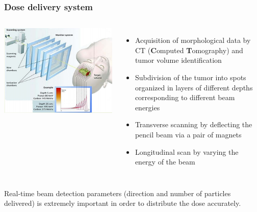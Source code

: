 \documentclass[aspectratio=169]{beamer}
\begin{document}
	\begin{frame}
		\frametitle{Dose delivery system}
		\begin{columns}
			\includegraphics[width=0.95 \textwidth]{IMG/Beam_Monitoring.PNG}
			\begin{itemize}
				\item Acquisition of morphological data by CT (\textbf{C}omputed \textbf{T}omography) and tumor volume identification
				\item Subdivision of the tumor into spots organized in layers of different depths corresponding to different beam energies
				\item Transverse scanning by deflecting the pencil beam via a pair of magnets
				\item Longitudinal scan by varying the energy of the beam
			\end{itemize}
		\end{columns}
	\vspace{0.2 cm}
	{\color{blue} Real-time beam detection parameters (direction and number of particles delivered) \newline is extremely important in order to distribute the dose accurately.}
	\end{frame}
\end{document}
